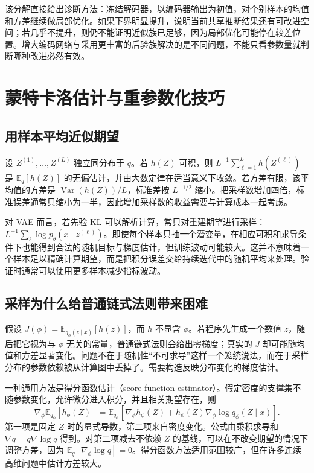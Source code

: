 \documentclass[UTF8,12pt,a4paper,fontset=fandol]{ctexart}
\begin{document}
该分解直接给出诊断方法：冻结解码器，以编码器输出为初值，对个别样本的均值和方差继续做局部优化。如果下界明显提升，说明当前共享推断结果还有可改进空间；若几乎不提升，则仍不能证明近似族已足够，因为局部优化可能停在较差位置。增大编码网络与采用更丰富的后验族解决的是不同问题，不能只看参数量就判断哪种改进必然有效。

\section{蒙特卡洛估计与重参数化技巧}
\label{sec:vae-reparameterization}

\subsection{用样本平均近似期望}
设 $Z^{(1)},\ldots,Z^{(L)}$ 独立同分布于 $q$。若 $h(Z)$ 可积，则 $L^{-1}\sum_{\ell=1}^{L}h(Z^{(\ell)})$ 是 $\mathbb E_q[h(Z)]$ 的无偏估计，并由大数定律在适当意义下收敛。若方差有限，该平均值的方差是 $\operatorname{Var}(h(Z))/L$，标准差按 $L^{-1/2}$ 缩小。把采样数增加四倍，标准误差通常只缩小为一半，因此增加采样数的收益需要与计算成本一起考虑。

对 VAE 而言，若先验 KL 可以解析计算，常只对重建期望进行采样：$L^{-1}\sum_\ell\log p_\theta(x\mid z^{(\ell)})$。即使每个样本只抽一个潜变量，在相应可积和求导条件下也能得到合法的随机目标与梯度估计，但训练波动可能较大。这并不意味着一个样本足以精确计算期望，而是把积分误差交给持续迭代中的随机平均来处理。验证时通常可以使用更多样本减少指标波动。

\subsection{采样为什么给普通链式法则带来困难}
假设 $J(\phi)=\mathbb E_{q_\phi(z\mid x)}[h(z)]$，而 $h$ 不显含 $\phi$。若程序先生成一个数值 $z$，随后把它视为与 $\phi$ 无关的常量，普通链式法则会给出零梯度；真实的 $J$ 却可能随均值和方差显著变化。问题不在于随机性“不可求导”这样一个笼统说法，而在于采样分布的参数依赖被从计算图中丢掉了。需要构造反映分布变化的梯度估计。

一种通用方法是得分函数估计（score-function estimator）。假定密度的支撑集不随参数变化，允许微分进入积分，并且相关期望存在，则
\begin{equation}
 \nabla_\phi\mathbb E_{q_\phi}[h_\phi(Z)]
 =\mathbb E_{q_\phi}\left[
   \nabla_\phi h_\phi(Z)+h_\phi(Z)\nabla_\phi\log q_\phi(Z\mid x)
 \right].
 \label{eq:vae-score-gradient}
\end{equation}
第一项是固定 $Z$ 时的显式导数，第二项来自密度变化。公式由乘积求导和 $\nabla q=q\nabla\log q$ 得到。对第二项减去不依赖 $Z$ 的基线，可以在不改变期望的情况下调整方差，因为 $\mathbb E_q[\nabla_\phi\log q]=0$。得分函数方法适用范围较广，但在许多连续高维问题中估计方差较大。
\end{document}
